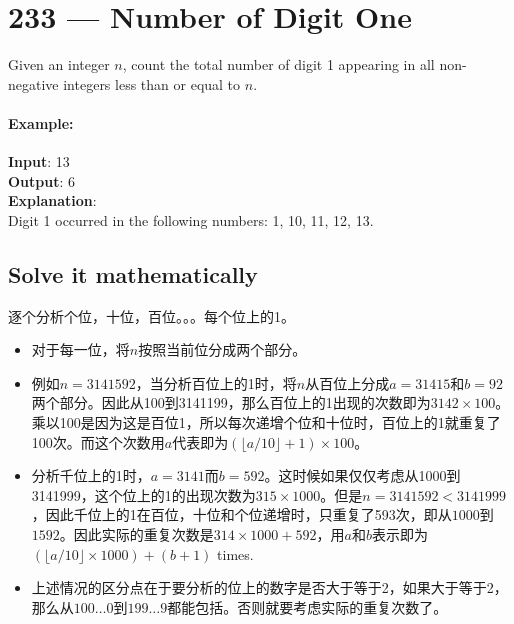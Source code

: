 \section{233 --- Number of Digit One}
Given an integer $n$, count the total number of digit 1 appearing in all non-negative integers less than or equal to $n$.

\paragraph{Example:}

\begin{flushleft}
\textbf{Input}: 13
\\
\textbf{Output}: 6 
\\
\textbf{Explanation}: 
\\
Digit 1 occurred in the following numbers: 1, 10, 11, 12, 13.
\end{flushleft}
\subsection{Solve it mathematically}
逐个分析个位，十位，百位。。。每个位上的1。

\begin{itemize}
\item 对于每一位，将$n$按照当前位分成两个部分。
\item 例如$n=3141592$，当分析百位上的1时，将$n$从百位上分成$a=31415$和$b=92$两个部分。因此从100到3141199，那么百位上的1出现的次数即为$3142\times 100$。乘以100是因为这是百位1，所以每次递增个位和十位时，百位上的1就重复了100次。而这个次数用$a$代表即为$(\lfloor a/10\rfloor+1)\times 100$。
\item 分析千位上的1时，$a=3141$而$b=592$。这时候如果仅仅考虑从1000到3141999，这个位上的1的出现次数为$315\times 1000$。但是$n=3141592 < 3141999$，因此千位上的1在百位，十位和个位递增时，只重复了593次，即从$1000$到$1592$。因此实际的重复次数是$314\times 1000 + 592$，用$a$和$b$表示即为 $(\lfloor a / 10\rfloor \times 1000) + (b + 1)$ times.
\item 上述情况的区分点在于要分析的位上的数字是否大于等于2，如果大于等于2，那么从$100\ldots0$到$199\ldots9$都能包括。否则就要考虑实际的重复次数了。
\end{itemize}

